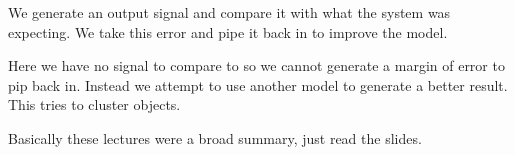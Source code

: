 \documentclass{article}
\begin{document}

We generate an output signal and compare it with what the system was expecting. We take this error and pipe it back in to improve the model.


Here we have no signal to compare to so we cannot generate a margin of error to pip back in. Instead we attempt to use another model to generate a better result. This tries to cluster objects.




Basically these lectures were a broad summary, just read the slides.
\end{document}
